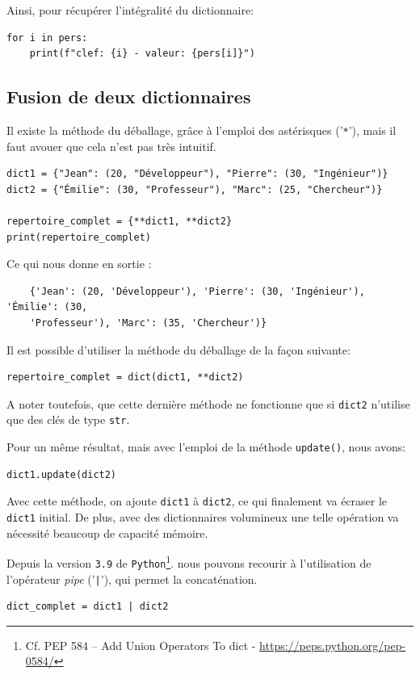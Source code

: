 \documentclass[a4paper,11pt]{book}
\begin{document}
Ainsi, pour récupérer l'intégralité du dictionnaire:
\begin{lstlisting}
for i in pers:
    print(f"clef: {i} - valeur: {pers[i]}")
\end{lstlisting}
\medskip

\subsection*{Fusion de deux dictionnaires}\label{fusion_dict}
Il existe la méthode du déballage, grâce à l'emploi des astérisques ('\texttt{*}'), mais il faut avouer que cela n'est pas très intuitif.
\begin{lstlisting}
dict1 = {"Jean": (20, "Développeur"), "Pierre": (30, "Ingénieur")}
dict2 = {"Émilie": (30, "Professeur"), "Marc": (25, "Chercheur")}

repertoire_complet = {**dict1, **dict2}
print(repertoire_complet)
\end{lstlisting}
\medskip

Ce qui nous donne en sortie :
\begin{verbatim}
    {'Jean': (20, 'Développeur'), 'Pierre': (30, 'Ingénieur'), 'Émilie': (30, 
    'Professeur'), 'Marc': (35, 'Chercheur')}
\end{verbatim}
\medskip

Il est possible d'utiliser la méthode du déballage de la façon suivante:
\begin{lstlisting}
repertoire_complet = dict(dict1, **dict2)
\end{lstlisting}
\medskip

A noter toutefois, que cette dernière méthode ne fonctionne que si \texttt{dict2} n'utilise que des clés de type \texttt{str}.
\medskip

Pour un même résultat, mais avec l'emploi de la méthode \texttt{update()}, nous avons:
\begin{lstlisting}
dict1.update(dict2)
\end{lstlisting}
\medskip

Avec cette méthode, on ajoute \texttt{dict1} à \texttt{dict2}, ce qui finalement va écraser le \texttt{dict1} initial. De plus, avec des dictionnaires volumineux une telle opération va nécessité beaucoup de capacité mémoire.
\medskip

Depuis la version \texttt{3.9} de \texttt{Python}\footnote{Cf. PEP 584 – Add Union Operators To dict - \url{https://peps.python.org/pep-0584/}}. nous pouvons recourir à l'utilisation de l'opérateur \textit{pipe} ('\texttt{|}'), qui permet la concaténation.
\begin{lstlisting}
dict_complet = dict1 | dict2
\end{lstlisting}
\medskip
\end{document}
